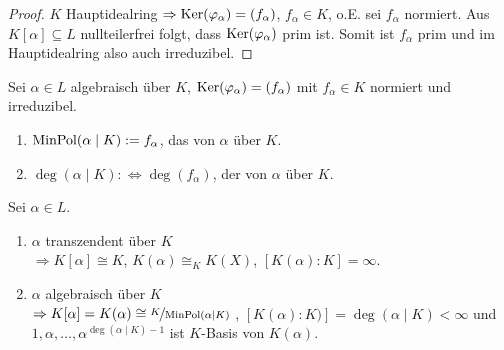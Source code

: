 \begin{proof}
	$K$ Hauptidealring $\Rightarrow \operatorname{Ker}(\varphi_\alpha) = (f_\alpha)$, $f_\alpha \in K$, o.E. sei $f_{\alpha}$ normiert. Aus $K[\alpha] \subseteq L$ nullteilerfrei folgt, dass $\operatorname{Ker}(\varphi_\alpha)$ prim ist. Somit ist $f_\alpha$ prim und im Hauptidealring also auch irreduzibel.
\end{proof}

\begin{definition}
	Sei $\alpha \in L$ algebraisch über $K$, $\operatorname{Ker}(\varphi_\alpha) = (f_\alpha)$ mit $f_\alpha \in K$ normiert und irreduzibel.
	\begin{enumerate}
		\item $\operatorname{MinPol}(\alpha\mid K) := f_\alpha$, das  von $\alpha$ über $K$.
		\item $\deg(\alpha\mid K) :\Leftrightarrow \deg(f_\alpha)$, der  von $\alpha$ über $K$.
	\end{enumerate}
\end{definition}

\begin{proposition}
	Sei $\alpha \in L$.
	\begin{enumerate}
		\item $\alpha$ transzendent über $K$ \\
		$\Rightarrow K[\alpha] \cong K$, $K(\alpha) \cong_K K(X)$, $[K(\alpha) : K] = \infty$.
		\item $\alpha$ algebraisch über $K$ \\
		$\Rightarrow K[\alpha] = K(\alpha) \cong \lnkset{K}{\MinPol(\alpha\mid K)}$ , $[ K(\alpha) \colon K)]  = \deg(\alpha \mid K) < \infty$ und \\
		$1, \alpha, \dots , \alpha^{\deg(\alpha \mid K) -1}$ ist $K$-Basis von $K(\alpha)$. 
	\end{enumerate}
\end{proposition}

